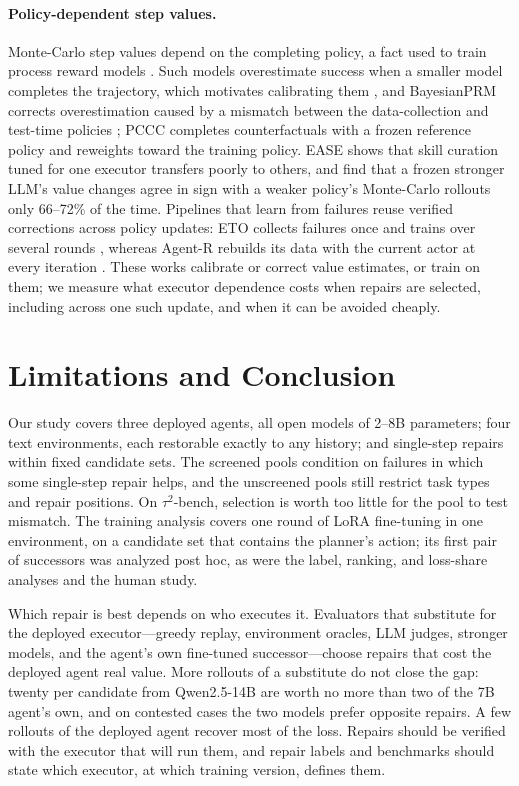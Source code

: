 \documentclass{article}
\newcommand{\tautwo}{$\tau^2$-bench}
\theoremstyle{plain}
\theoremstyle{definition}
\theoremstyle{remark}
\begin{document}
\paragraph{Policy-dependent step values.}
Monte-Carlo step values depend on the completing policy, a fact used to train process reward models \citep{wang2024mathshepherd,xiong2024ipr,choudhury2025agentprm}. Such models overestimate success when a smaller model completes the trajectory, which motivates calibrating them \citep{park2025calibration}, and BayesianPRM corrects overestimation caused by a mismatch between the data-collection and test-time policies \citep{qiao2026bayesianprm}; PCCC \citep{meng2026pccc} completes counterfactuals with a frozen reference policy and reweights toward the training policy. EASE \citep{xiong2026ease} shows that skill curation tuned for one executor transfers poorly to others, and \citet{zhu2026lvrl} find that a frozen stronger LLM's value changes agree in sign with a weaker policy's Monte-Carlo rollouts only 66--72\% of the time. Pipelines that learn from failures reuse verified corrections across policy updates: ETO collects failures once and trains over several rounds \citep{song2024eto}, whereas Agent-R rebuilds its data with the current actor at every iteration \citep{yuan2025agentr}. These works calibrate or correct value estimates, or train on them; we measure what executor dependence costs when repairs are selected, including across one such update, and when it can be avoided cheaply.

\section{Limitations and Conclusion}
\label{sec:conclusion}

Our study covers three deployed agents, all open models of 2--8B parameters; four text environments, each restorable exactly to any history; and single-step repairs within fixed candidate sets. The screened pools condition on failures in which some single-step repair helps, and the unscreened pools still restrict task types and repair positions. On \tautwo{}, selection is worth too little for the pool to test mismatch. The training analysis covers one round of LoRA fine-tuning in one environment, on a candidate set that contains the planner's action; its first pair of successors was analyzed post hoc, as were the label, ranking, and loss-share analyses and the human study.

Which repair is best depends on who executes it. Evaluators that substitute for the deployed executor---greedy replay, environment oracles, LLM judges, stronger models, and the agent's own fine-tuned successor---choose repairs that cost the deployed agent real value. More rollouts of a substitute do not close the gap: twenty per candidate from Qwen2.5-14B are worth no more than two of the 7B agent's own, and on contested cases the two models prefer opposite repairs. A few rollouts of the deployed agent recover most of the loss. Repairs should be verified with the executor that will run them, and repair labels and benchmarks should state which executor, at which training version, defines them.
\end{document}
